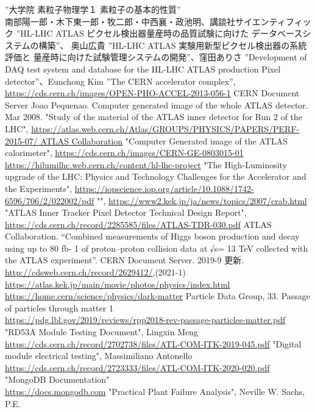 \begin{thebibliography}{24}
”大学院 素粒子物理学１ 素粒子の基本的性質” \\ 南部陽一郎・木下東一郎・牧二郎・中西襄・政池明、講談社サイエンティフィック
”HL-LHC ATLAS ピクセル検出器量産時の品質試験に向けた データベースシステムの構築”、 奥山広貴
”HL-LHC ATLAS 実験用新型ピクセル検出器の系統評価と 量産時に向けた試験管理システムの開発”、窪田ありさ
”Development of DAQ test system and database for the HL-LHC ATLAS production Pixel detector”、Eunchong Kim
”The CERN accelerator complex”,\\ \url{https://cds.cern.ch/images/OPEN-PHO-ACCEL-2013-056-1} CERN Document Server
Joao Pequenao. Computer generated image of the whole ATLAS detector. Mar 2008.
"Study of the material of the ATLAS inner detector for Run 2 of the LHC", \url{https://atlas.web.cern.ch/Atlas/GROUPS/PHYSICS/PAPERS/PERF-2015-07/ ATLAS Collaboration}
"Computer Generated image of the ATLAS calorimeter", \url{https://cds.cern.ch/images/CERN-GE-0803015-01}
\url{https://hilumilhc.web.cern.ch/content/hl-lhc-project}
"The High-Luminosity upgrade of the LHC: Physics and Technology Challenges for the Accelerator and the Experiments", \url{https://iopscience.iop.org/article/10.1088/1742-6596/706/2/022002/pdf}
"", \url{https://www2.kek.jp/ja/news/topics/2007/crab.html}
"ATLAS Inner Tracker Pixel Detector Technical Design Report", \url{https://cds.cern.ch/record/2285585/files/ATLAS-TDR-030.pdf}
ATLAS Collaboration. “Combined measurements of Higgs boson production and decay using up to 80 fb- 1 of proton–proton collision data at √s= 13 TeV collected with the ATLAS experiment”. CERN Document Server. 2019-9 更新. \url{http://cdsweb.cern.ch/record/2629412/},(2021-1)
\url{https://atlas.kek.jp/main/movie/photos/physics/index.html}
\url{https://home.cern/science/physics/dark-matter}
Particle Data Group, 33. Passage of particles through matter 1\\
\url{https://pdg.lbl.gov/2019/reviews/rpp2018-rev-passage-particles-matter.pdf}
"RD53A Module Testing Document", Lingxin Meng\\ \url{https://cds.cern.ch/record/2702738/files/ATL-COM-ITK-2019-045.pdf}
"Digital module electrical testing", Massimiliano Antonello\\ \url{https://cds.cern.ch/record/2723333/files/ATL-COM-ITK-2020-020.pdf}
"MongoDB Documentation" \\ \url{https://docs.mongodb.com}
"Practical Plant Failure Analysis", Neville W. Sachs, P.E.
\end{thebibliography}
